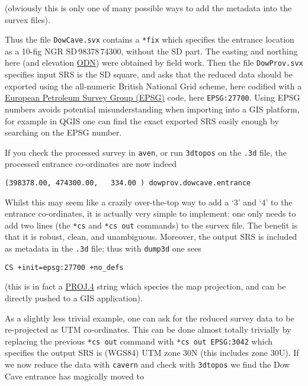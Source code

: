 \documentclass[]{article}
\begin{document}
(obviously this is only one of many possible ways to add the metadata
into the survex files).

Thus the file \verb}DowCave.svx} contains a \verb}*fix} which
specifies the entrance location as a 10-fig NGR
SD\,98378\,74300, without the SD part. The easting and
northing here (and elevation
\href{https://en.wikipedia.org/wiki/Ordnance_datum}{ODN}) were obtained
by field work. Then the file \verb}DowProv.svx} specifies input SRS is
the SD square, and asks that the reduced data should be exported
using the all-numeric British National Grid scheme, here codified with a
\href{http://spatialreference.org/}{European Petroleum Survey Group
  (EPSG)} code, here \verb+EPSG:27700+.
Using EPSG numbers avoids potential misunderstanding when
importing into a GIS platform, for example in QGIS one can find the
exact exported SRS easily enough by searching on the EPSG number.

If you check the processed survey in \verb}aven}, or run
\verb}3dtopos} on the \verb}.3d} file, the processed entrance
co-ordinates are now indeed

\begin{verbatim}
(398378.00, 474300.00,   334.00 ) dowprov.dowcave.entrance
\end{verbatim}

Whilst this may seem like a crazily over-the-top way to add a `3' and
`4' to the entrance co-ordinates, it is actually very simple to
implement: one only needs to add two lines (the \verb}*cs} and
\verb}*cs out} commands) to the survex file. The benefit is that it
is robust, clean, and unambiguous. Moreover, the output SRS is included
as metadata in the \verb}.3d} file; thus with \verb}dump3d} one sees

\begin{verbatim}
CS +init=epsg:27700 +no_defs
\end{verbatim}

(this is in fact a \href{http://proj4.org/}{PROJ.4} string which species
the map projection, and can be directly pushed to a GIS application).

As a slightly less trivial example, one can ask for the reduced survey
data to be re-projected as UTM co-ordinates. This can be done almost
totally trivially by replacing the previous \verb}*cs out} command
with \verb}*cs out EPSG:3042} which specifies the output SRS is
(WGS84) UTM zone 30N (this includes zone 30U). If we now reduce the data
with \verb}cavern} and check with \verb}3dtopos} we find the Dow
Cave entrance has magically moved to
\end{document}
